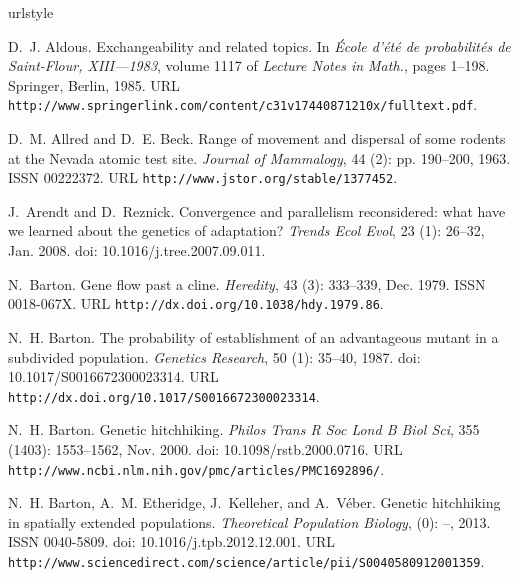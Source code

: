 \documentclass[10pt,letterpaper]{article}
\begin{document}
% 
\begin{thebibliography}{68}
\providecommand{\natexlab}[1]{#1}
\providecommand{\url}[1]{\texttt{#1}}
\expandafter\ifx\csname urlstyle\endcsname\relax
  \providecommand{\doi}[1]{doi: #1}\else
  \providecommand{\doi}{doi: \begingroup \urlstyle{rm}\Url}\fi

D.~J. Aldous.
\newblock Exchangeability and related topics.
\newblock In \emph{École d'été de probabilités de {S}aint-{F}lour,
  {XIII}---1983}, volume 1117 of \emph{Lecture Notes in Math.}, pages 1--198.
  Springer, Berlin, 1985.
\newblock URL
  \url{http://www.springerlink.com/content/c31v17440871210x/fulltext.pdf}.

D.~M. Allred and D.~E. Beck.
\newblock Range of movement and dispersal of some rodents at the {Nevada}
  atomic test site.
\newblock \emph{Journal of Mammalogy}, 44 (2): pp. 190--200,
  1963.
\newblock ISSN 00222372.
\newblock URL \url{http://www.jstor.org/stable/1377452}.

J.~Arendt and D.~Reznick.
\newblock Convergence and parallelism reconsidered: what have we learned about
  the genetics of adaptation?
\newblock \emph{Trends Ecol Evol}, 23 (1): 26--32, Jan. 2008.
\newblock \doi{10.1016/j.tree.2007.09.011}.

N.~Barton.
\newblock Gene flow past a cline.
\newblock \emph{Heredity}, 43 (3): 333--339, Dec. 1979.
\newblock ISSN 0018-067X.
\newblock URL \url{http://dx.doi.org/10.1038/hdy.1979.86}.

N.~H. Barton.
\newblock The probability of establishment of an advantageous mutant in a
  subdivided population.
\newblock \emph{Genetics Research}, 50 (1): 35--40, 1987.
\newblock \doi{10.1017/S0016672300023314}.
\newblock URL \url{http://dx.doi.org/10.1017/S0016672300023314}.

N.~H. Barton.
\newblock Genetic hitchhiking.
\newblock \emph{Philos Trans R Soc Lond B Biol Sci}, 355
  (1403): 1553--1562, Nov. 2000.
\newblock \doi{10.1098/rstb.2000.0716}.
\newblock URL \url{http://www.ncbi.nlm.nih.gov/pmc/articles/PMC1692896/}.

N.~H. Barton, A.~M. Etheridge, J.~Kelleher, and A.~Véber.
\newblock Genetic hitchhiking in spatially extended populations.
\newblock \emph{Theoretical Population Biology},  (0): --,
  2013.
\newblock ISSN 0040-5809.
\newblock \doi{10.1016/j.tpb.2012.12.001}.
\newblock URL
  \url{http://www.sciencedirect.com/science/article/pii/S0040580912001359}.


\end{thebibliography}
\end{document}
